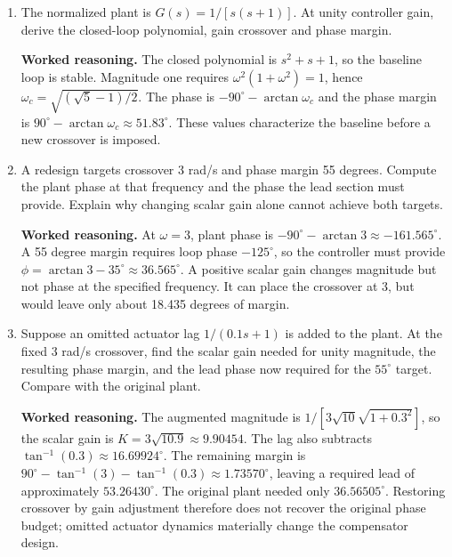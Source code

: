 \documentclass[10pt,a4paper]{article}
\newcommand{\answer}{\par\smallskip\textbf{Worked reasoning.} }
\begin{document}
\begin{enumerate}
\item The normalized plant is $G(s)=1/[s(s+1)]$. At unity controller gain, derive the closed-loop polynomial, gain crossover and phase margin.
\answer The closed polynomial is $s^2+s+1$, so the baseline loop is stable. Magnitude one requires $\omega^2(1+\omega^2)=1$, hence $\omega_c=\sqrt{(\sqrt5-1)/2}$. The phase is $-90^\circ-\arctan\omega_c$ and the phase margin is $90^\circ-\arctan\omega_c\approx51.83^\circ$. These values characterize the baseline before a new crossover is imposed.
\item A redesign targets crossover 3 rad/s and phase margin 55 degrees. Compute the plant phase at that frequency and the phase the lead section must provide. Explain why changing scalar gain alone cannot achieve both targets.
\answer At $\omega=3$, plant phase is $-90^\circ-\arctan3\approx-161.565^\circ$. A 55 degree margin requires loop phase $-125^\circ$, so the controller must provide $\phi=\arctan3-35^\circ\approx36.565^\circ$. A positive scalar gain changes magnitude but not phase at the specified frequency. It can place the crossover at 3, but would leave only about 18.435 degrees of margin.
\item Suppose an omitted actuator lag $1/(0.1s+1)$ is added to the plant. At the fixed 3 rad/s crossover, find the scalar gain needed for unity magnitude, the resulting phase margin, and the lead phase now required for the $55^\circ$ target. Compare with the original plant.
\answer The augmented magnitude is $1/[3\sqrt{10}\sqrt{1+0.3^2}]$, so the scalar gain is $K=3\sqrt{10.9}\approx9.90454$. The lag also subtracts $\tan^{-1}(0.3)\approx16.69924^\circ$. The remaining margin is $90^\circ-\tan^{-1}(3)-\tan^{-1}(0.3)\approx1.73570^\circ$, leaving a required lead of approximately $53.26430^\circ$. The original plant needed only $36.56505^\circ$. Restoring crossover by gain adjustment therefore does not recover the original phase budget; omitted actuator dynamics materially change the compensator design.
\end{enumerate}
\end{document}
